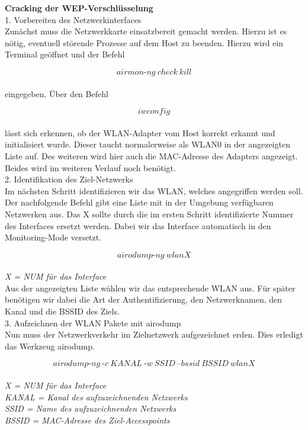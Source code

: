 \textbf{\Large{Cracking der WEP-Verschlüsselung}}\\ 

{\Large 1. Vorbereiten des Netzwerkinterfaces}\\
Zunächst muss die Netzwerkkarte einsatzbereit gemacht werden. Hierzu ist es nötig, eventuell störende Prozesse auf dem Host zu beenden. Hierzu wird ein Terminal geöffnet und der Befehl

$$airmon\text{-}ng~check~kill$$\\

eingegeben. Über den Befehl 

$$iwconfig$$\\ 

lässt sich erkennen, ob der WLAN-Adapter vom Host korrekt erkannt und initialisiert wurde. Dieser taucht normalerweise als WLAN0 in der angezeigten Liste auf. Des weiteren wird hier auch die MAC-Adresse des Adapters angezeigt. 
Beides wird im weiteren Verlauf noch benötigt.\\

{\Large 2. Identifikation des Ziel-Netzwerks}\\
Im nächsten Schritt identifizieren wir das WLAN, welches angegriffen werden soll. Der nachfolgende Befehl gibt eine Liste mit in der Umgebung verfügbaren Netzwerken aus. Das X sollte durch die im ersten Schritt identifizierte Nummer des Interfaces ersetzt werden. Dabei wir das Interface automatisch in den Monitoring-Mode versetzt. 

$$airodump\text{-}ng~wlanX$$\\
\textit{X = NUM für das Interface}\\

Aus der angezeigten Liste wählen wir das entsprechende WLAN aus. Für später benötigen wir dabei die Art der Authentifizierung, den Netzwerknamen, den Kanal und die BSSID des Ziels.\\

{\Large 3. Aufzeichnen der WLAN Pakete mit airodump}\\
Nun muss der Netzwerkverkehr im Zielnetzwerk aufgezeichnet erden. Dies erledigt das Werkzeug airodump.

$$airodump\text{-}ng~\text{-}c~KANAL~ \text{-}w~SSID~\text{--}bssid~BSSID~wlanX$$\\
\textit{X = NUM für das Interface}\\
\textit{KANAL = Kanal des aufzuzeichnenden Netzwerks}\\
\textit{SSID = Name des aufzuzeichnenden Netzwerks}\\
\textit{BSSID = MAC-Adresse des Ziel-Accesspoints}\\

